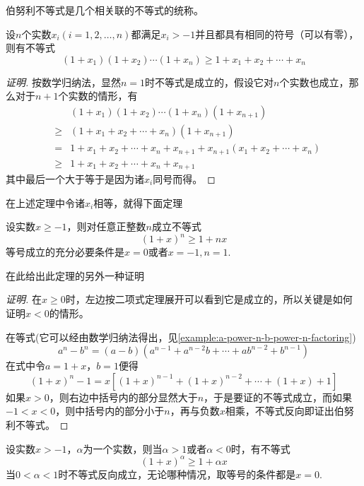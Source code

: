 伯努利不等式是几个相关联的不等式的统称。

\begin{theorem}
  \label{theorem:bernoulli-inequality-multipli-many-number}
  设$n$个实数$x_i(i=1,2,\ldots,n)$都满足$x_i>-1$并且都具有相同的符号（可以有零），则有不等式
  \[ (1+x_1)(1+x_2)\cdots(1+x_n) \geqslant 1+x_1+x_2+\cdots+x_n \]
\end{theorem}

\begin{proof}[证明]
  按数学归纳法，显然$n=1$时不等式是成立的，假设它对$n$个实数也成立，那么对于$n+1$个实数的情形，有
  \begin{eqnarray*}
    && (1+x_1)(1+x_2)\cdots(1+x_n)(1+x_{n+1}) \\
    &\geqslant & (1+x_1+x_2+\cdots+x_n)(1+x_{n+1}) \\
    &= & 1+x_1+x_2+\cdots+x_n+x_{n+1} + x_{n+1}(x_1+x_2+\cdots+x_n) \\
    &\geqslant & 1+x_1+x_2+\cdots+x_n+x_{n+1}
  \end{eqnarray*}
  其中最后一个大于等于是因为诸$x_i$同号而得。
\end{proof}

在上述定理中令诸$x_i$相等，就得下面定理
\begin{theorem}
  \label{theorem:bernoulli-inequality-power}
  设实数$x \geqslant -1$，则对任意正整数$n$成立不等式
  \begin{equation}
    \label{eq:bernoulli-inequality-power}
   (1+x)^n \geqslant 1+nx 
 \end{equation}
 等号成立的充分必要条件是$x=0$或者$x=-1,n=1$.
\end{theorem}

在此给出此定理的另外一种证明
\begin{proof}[证明]
  在$x \geqslant 0$时，左边按二项式定理展开可以看到它是成立的，所以关键是如何证明$x<0$的情形。

  在等式(它可以经由数学归纳法得出，见\autoref{example:a-power-n-b-power-n-factoring})
  \[ a^n-b^n = (a-b)(a^{n-1}+a^{n-2}b+\cdots+ab^{n-2}+b^{n-1}) \]
  在式中令$a=1+x$，$b=1$便得
  \[ (1+x)^n-1=x \left[ (1+x)^{n-1}+(1+x)^{n-2}+\cdots+(1+x)+1 \right] \]
  如果$x>0$，则右边中括号内的部分显然大于$n$，于是要证的不等式成立，而如果$-1<x<0$，则中括号内的部分小于$n$，再与负数$x$相乘，不等式反向即证出伯努利不等式。
\end{proof}

\begin{theorem}
  \label{theorem:bernoulli-inequality-real}
  设实数$x>-1$，$\alpha$为一个实数，则当$\alpha>1$或者$\alpha<0$时，有不等式
  \[ (1+x)^{\alpha} \geqslant 1+\alpha x \]
  当$0<\alpha<1$时不等式反向成立，无论哪种情况，取等号的条件都是$x=0$.
\end{theorem}


